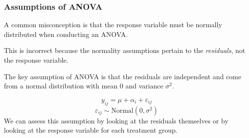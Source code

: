 \documentclass[color=usenames,dvipsnames]{beamer}\usepackage[]{graphicx}\usepackage[]{color}
\begin{document}




\begin{frame}
  \frametitle{Assumptions of ANOVA}
  {%
    A common misconception is that the response variable must be
    normally distributed when conducting an ANOVA.}
  \pause
  \vfill
  {%
    This is incorrect because the normality assumptions pertain to
    the {\it residuals}, \alert{not} the response variable.

    \pause
    \vfill
    The key assumption of
    ANOVA is that the residuals are independent and come from a normal
    distribution with mean 0 and variance $\sigma^2$.}
  \pause
  \large
\[
  y_{ij} = \mu + \alpha_i + \varepsilon_{ij}
\]
\[
  \varepsilon_{ij} \sim \text{Normal}(0, \sigma^2)
\]
\pause
\normalsize
  {%
    We can assess this assumption by looking at the residuals
    themselves or by looking at the response variable for each treatment group. }
\end{frame}
\end{document}
